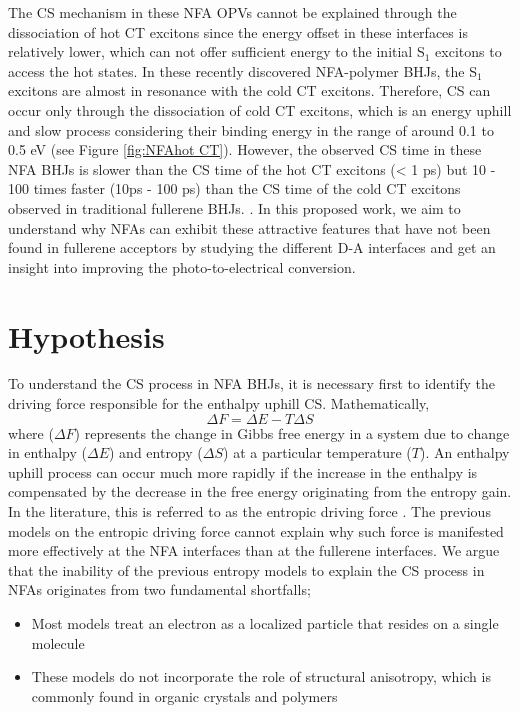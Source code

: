 \documentclass[12pt]{article}
\begin{document}
The CS mechanism in these NFA OPVs cannot be explained through the dissociation of hot CT excitons since the energy offset in these interfaces is relatively lower, which can not offer sufficient energy to the initial S$_1$ excitons to access the hot states. In these recently discovered NFA-polymer BHJs, the S$_1$ excitons are almost in resonance with the cold CT excitons. Therefore, CS can occur only through the dissociation of cold CT excitons, which is an energy uphill and slow process considering their binding energy in the range of around 0.1 to 0.5 eV (see Figure \ref{fig:NFAhot CT}). However, the observed CS time in these NFA BHJs is slower than the CS time of the hot CT excitons (< 1 ps) but 10 - 100 times faster (10ps - 100 ps) than the CS time of the cold CT excitons observed in traditional fullerene BHJs.  \cite{qian2018design,dimitrov2019spectroscopic,menke2018order,liu2018unexpectedly}. In this proposed work, we aim to understand why NFAs can exhibit these attractive features that have not been found in fullerene acceptors by studying the different D-A interfaces and get an insight into improving the photo-to-electrical conversion. 

\section{Hypothesis}
To understand the CS process in NFA BHJs, it is necessary first to identify the driving force responsible for the enthalpy uphill CS. Mathematically,
\begin{equation}
    \Delta F = \Delta E - T\Delta S
\end{equation}
where ($\Delta F$) represents the change in Gibbs free energy in a system due to change in enthalpy ($\Delta E$) and entropy ($\Delta S$) at a particular temperature ($T$). An enthalpy uphill process can occur much more rapidly if the increase in the enthalpy is compensated by the decrease in the free energy originating from the entropy gain. In the literature, this is referred to as the entropic driving force \cite{clarke2010charge,monahan2015direct,gregg2011entropy,hood2016entropy}. The previous models on the entropic driving force cannot explain why such force is manifested more effectively at the NFA interfaces than at the fullerene interfaces. We argue that the inability of the previous entropy models to explain the CS process in NFAs originates from two fundamental shortfalls;
\begin{itemize}
    \item Most models treat an electron as a localized particle that resides on a single molecule
    \item These models do not incorporate the role of structural anisotropy, which is commonly found in organic crystals and polymers
\end{itemize}
\end{document}
